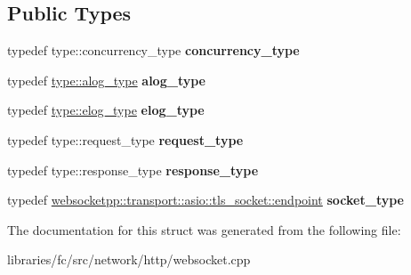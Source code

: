 \subsection*{Public Types}
\begin{DoxyCompactItemize}
\item 
\mbox{\label{structfc_1_1http_1_1detail_1_1asio__tls__stub__log_1_1transport__config_aba57be961b8a7b342bd56046a2a26666}} 
typedef type\+::concurrency\+\_\+type {\bfseries concurrency\+\_\+type}
\item 
\mbox{\label{structfc_1_1http_1_1detail_1_1asio__tls__stub__log_1_1transport__config_a61ae9052f36d722a89bd821a6a3f2ffe}} 
typedef \mbox{\hyperlink{classwebsocketpp_1_1log_1_1stub}{type\+::alog\+\_\+type}} {\bfseries alog\+\_\+type}
\item 
\mbox{\label{structfc_1_1http_1_1detail_1_1asio__tls__stub__log_1_1transport__config_ac0b2f5e25434813ca37a2091ae5b5db4}} 
typedef \mbox{\hyperlink{classwebsocketpp_1_1log_1_1stub}{type\+::elog\+\_\+type}} {\bfseries elog\+\_\+type}
\item 
\mbox{\label{structfc_1_1http_1_1detail_1_1asio__tls__stub__log_1_1transport__config_ab246501eec3ed74af4660a1007b66c34}} 
typedef type\+::request\+\_\+type {\bfseries request\+\_\+type}
\item 
\mbox{\label{structfc_1_1http_1_1detail_1_1asio__tls__stub__log_1_1transport__config_ab545ba32f3faa52def1377ef7f58ae83}} 
typedef type\+::response\+\_\+type {\bfseries response\+\_\+type}
\item 
\mbox{\label{structfc_1_1http_1_1detail_1_1asio__tls__stub__log_1_1transport__config_a03da1dc53ca36fddc5bf880b07d16b75}} 
typedef \mbox{\hyperlink{classwebsocketpp_1_1transport_1_1asio_1_1tls__socket_1_1endpoint}{websocketpp\+::transport\+::asio\+::tls\+\_\+socket\+::endpoint}} {\bfseries socket\+\_\+type}
\end{DoxyCompactItemize}


The documentation for this struct was generated from the following file\+:\begin{DoxyCompactItemize}
\item 
libraries/fc/src/network/http/websocket.\+cpp\end{DoxyCompactItemize}
